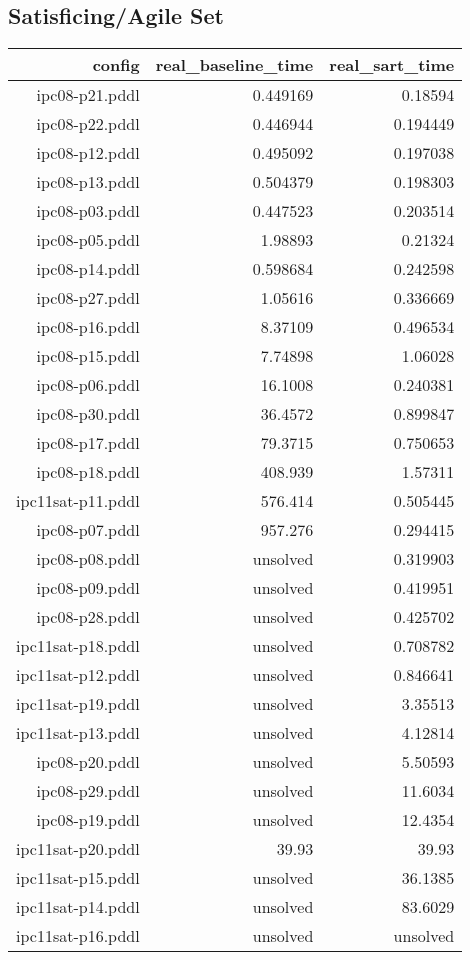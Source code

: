 \documentclass{article}
\begin{document}
                    \subsection*{Satisficing/Agile Set}
                    
                            \begin{center}
                            \scriptsize
                            \begin{tabular}{r|r|r}
                            config & real\_baseline\_time & real\_sart\_time\\\midrule
                             ipc08-p21.pddl&0.449169&0.18594\\
 ipc08-p22.pddl&0.446944&0.194449\\
 ipc08-p12.pddl&0.495092&0.197038\\
 ipc08-p13.pddl&0.504379&0.198303\\
 ipc08-p03.pddl&0.447523&0.203514\\
 ipc08-p05.pddl&1.98893&0.21324\\
 ipc08-p14.pddl&0.598684&0.242598\\
 ipc08-p27.pddl&1.05616&0.336669\\
 ipc08-p16.pddl&8.37109&0.496534\\
 ipc08-p15.pddl&7.74898&1.06028\\
 ipc08-p06.pddl&16.1008&0.240381\\
 ipc08-p30.pddl&36.4572&0.899847\\
 ipc08-p17.pddl&79.3715&0.750653\\
 ipc08-p18.pddl&408.939&1.57311\\
 ipc11sat-p11.pddl&576.414&0.505445\\
 ipc08-p07.pddl&957.276&0.294415\\
 ipc08-p08.pddl&unsolved&0.319903\\
 ipc08-p09.pddl&unsolved&0.419951\\
 ipc08-p28.pddl&unsolved&0.425702\\
 ipc11sat-p18.pddl&unsolved&0.708782\\
 ipc11sat-p12.pddl&unsolved&0.846641\\
 ipc11sat-p19.pddl&unsolved&3.35513\\
 ipc11sat-p13.pddl&unsolved&4.12814\\
 ipc08-p20.pddl&unsolved&5.50593\\
 ipc08-p29.pddl&unsolved&11.6034\\
 ipc08-p19.pddl&unsolved&12.4354\\
 ipc11sat-p20.pddl&39.93&39.93\\
 ipc11sat-p15.pddl&unsolved&36.1385\\
 ipc11sat-p14.pddl&unsolved&83.6029\\
 ipc11sat-p16.pddl&unsolved&unsolved
                            \end{tabular}
                            \end{center}
                    
\end{document}

